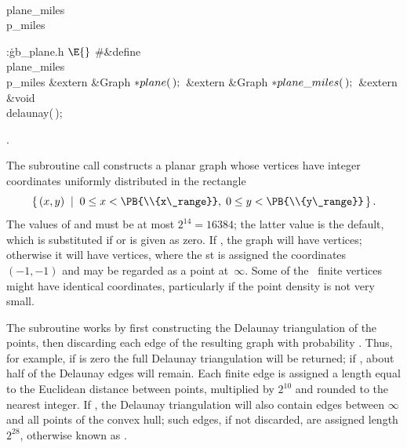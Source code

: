 \Y\B\4\D\\{plane\_miles}\5
\\{p\_miles}\par
\Y\B\4:\.{gb\_plane.h }\X${}\E{}$\6
\8\#\&{define} \\{plane\_miles}\5\\{p\_miles}\6
\&{extern} \&{Graph} ${}{*}\\{plane}(\,);{}$\6
\&{extern} \&{Graph} ${}{*}\\{plane\_miles}(\,);{}$\6
\&{extern} \&{void} \\{delaunay}(\,);\par
{}.\fi

The subroutine call  constructs
a planar graph whose vertices have integer coordinates
uniformly distributed in the rectangle
$$\{\,(x,y)\;\mid\;0\le x<\PB{\\{x\_range}}, \;0\le y<\PB{\\{y\_range}}\,\}%
\,.$$
The values of  and  must be at most
$2^{14}=16384$; the
latter value is the default, which is substituted if  or 
is given as zero. If , the graph will have 
vertices; otherwise
it will have  vertices, where the st is
assigned the coordinates
$(-1,-1)$ and may be regarded as a point at~$\infty$.
Some of the ~finite vertices might have identical coordinates,
particularly
if the point density  is not very small.

The subroutine works by first constructing the Delaunay triangulation
of the points, then discarding
each edge of the resulting graph with probability .
Thus,
for example, if  is zero the full Delaunay triangulation will be
returned; if , about half of the Delaunay edges will
remain.
Each finite edge is assigned a length equal to the Euclidean distance between
points, multiplied by $2^{10}$ and
rounded to the nearest integer. If , the
Delaunay triangulation will also contain edges between $\infty$ and
all points of the convex hull; such edges, if not discarded, are
assigned length $2^{28}$, otherwise known as .

